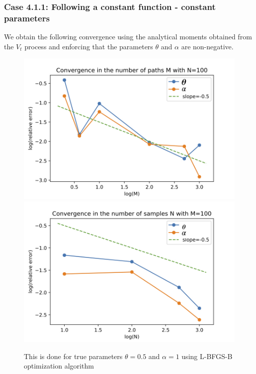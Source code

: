 \documentclass[aspectratio=169]{beamer}\usepackage[utf8]{inputenc}
\begin{document}
\begin{frame}\frametitle{ Case 4.1.1: Following a constant function - constant parameters }
We obtain the following convergence using the analytical moments obtained from the $V_t$ process and enforcing that the parameters $\theta$ and $\alpha$ are non-negative.

\begin{figure}
   \includegraphics[scale=0.22]{Figures/conv_M_moments_constant_func_sym.jpg}
    \includegraphics[scale=0.22]{Figures/conv_N_moments_constant_fun_symjpg.jpg}
  \caption{This is done for true parameters $\theta = 0.5$ and $\alpha=1$ using  L-BFGS-B optimization algorithm }
\end{figure}
\end{frame}
\end{document}
